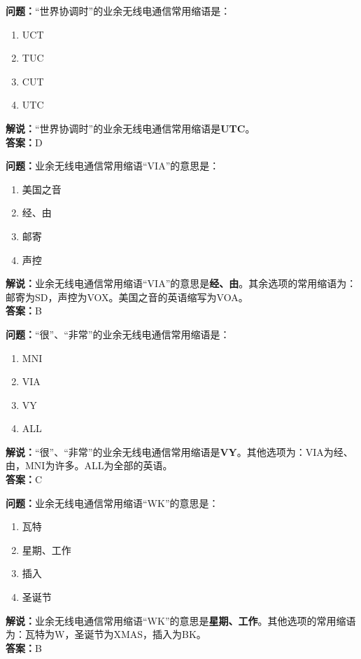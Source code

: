 


\bigskip


\noindent\textbf{问题：}“世界协调时”的业余无线电通信常用缩语是：
\begin{enumerate}[label=\Alph*), leftmargin=3em]
\item UCT
\item TUC
\item CUT
\item UTC
\end{enumerate}
\noindent\textbf{解说：}“世界协调时”的业余无线电通信常用缩语是\textbf{UTC}。\\\noindent\textbf{答案：}D



\bigskip


\noindent\textbf{问题：}业余无线电通信常用缩语“VIA”的意思是：
\begin{enumerate}[label=\Alph*), leftmargin=3em]
\item 美国之音%
\item 经、由
\item 邮寄
\item 声控
\end{enumerate}
\noindent\textbf{解说：}业余无线电通信常用缩语“VIA”的意思是\textbf{经、由}。其余选项的常用缩语为：邮寄为SD，声控为VOX。美国之音的英语缩写为VOA。\\\noindent\textbf{答案：}B


\bigskip


\noindent\textbf{问题：}“很”、“非常”的业余无线电通信常用缩语是：
\begin{enumerate}[label=\Alph*), leftmargin=3em]
\item MNI
\item VIA
\item VY
\item ALL
\end{enumerate}
\noindent\textbf{解说：}“很”、“非常”的业余无线电通信常用缩语是\textbf{VY}。其他选项为：VIA为经、由，MNI为许多。ALL为全部的英语。\\\noindent\textbf{答案：}C



\bigskip


\noindent\textbf{问题：}业余无线电通信常用缩语“WK”的意思是：
\begin{enumerate}[label=\Alph*), leftmargin=3em]
\item 瓦特
\item 星期、工作
\item 插入
\item 圣诞节
\end{enumerate}
\noindent\textbf{解说：}业余无线电通信常用缩语“WK”的意思是\textbf{星期、工作}。其他选项的常用缩语为：瓦特为W，圣诞节为XMAS，插入为BK。\\\noindent\textbf{答案：}B


